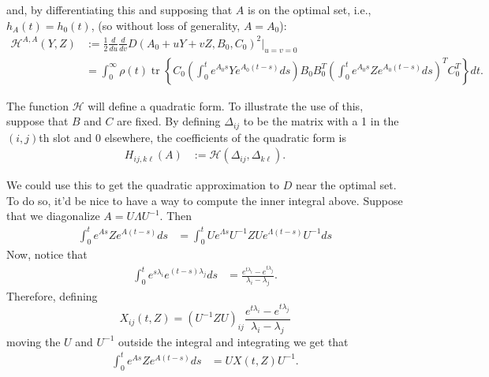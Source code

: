 \documentclass{article}
\newcommand{\tr}{\mathop{\mbox{tr}}} %
\newcommand{\calH}{\mathcal{H}}
\newcommand{\1}{\mathbbm{1}}
\begin{document}
and, by differentiating this and supposing that $A$ is on the optimal set,
i.e., $h_A(t)=h_0(t)$, (so without loss of generality, $A=A_0$):
\begin{equation}
  \begin{aligned}
      \calH^{A,A}(Y,Z) 
      &:= 
      \frac{1}{2} \frac{d}{du} \frac{d}{dv} D(A_0+uY+vZ,B_0,C_0)^2 \vert_{u=v=0} \\
      &=
        \int_0^\infty \rho(t) \tr\left\{ C_0 
        \left( \int_0^t e^{A_0 s} Y e^{A_0 (t-s)} ds \right) 
        B_0 B_0^T 
        \left( \int_0^t e^{A_0 s} Z e^{A_0 (t-s)} ds \right)^T
        C_0^T \right\} dt  .
  \end{aligned}
\end{equation}

The function $\calH$ will define a quadratic form.
To illustrate the use of this, suppose that $B$ and $C$ are fixed.
By defining $\Delta_{ij}$ to be the matrix with a 1 in the $(i,j)$th slot
and 0 elsewhere,
the coefficients of the quadratic form is
\begin{equation}
    \begin{aligned}
        H_{ij, k\ell}(A)
        &:=
        \calH(\Delta_{ij}, \Delta_{k\ell}) .
    \end{aligned}
\end{equation}

We could use this to get the quadratic approximation to $D$ near the optimal set.
To do so, it'd be nice to have a way to compute the inner integral above.
Suppose that we diagonalize $A = U \Lambda U^{-1}$.
Then
\begin{equation} \label{eqn:exp_deriv}
  \begin{aligned}
      \int_0^t e^{As} Z e^{A(t-s)} ds 
      &=
      \int_0^t U e^{\Lambda s} U^{-1} Z U e^{\Lambda (t-s)} U^{-1} ds 
  \end{aligned}
\end{equation}
Now, notice that
\begin{equation}
  \begin{aligned}
      \int_0^t e^{s \lambda_i} e^{(t-s) \lambda_j} ds
      &=
      \frac{ e^{t \lambda_i} - e^{t \lambda_j} }{ \lambda_i - \lambda_j } .
  \end{aligned}
\end{equation}
Therefore, 
defining
\begin{equation}
    X_{ij}(t,Z) = \left( U^{-1} Z U \right)_{ij}
      \frac{ e^{t \lambda_i} - e^{t \lambda_j} }{ \lambda_i - \lambda_j } 
\end{equation}
moving the $U$ and $U^{-1}$ outside the integral and integrating we get that
\begin{equation}
  \begin{aligned}
      \int_0^t e^{As} Z e^{A(t-s)} ds 
      &=
      U X(t,Z) U^{-1} .
  \end{aligned}
\end{equation}
\end{document}
